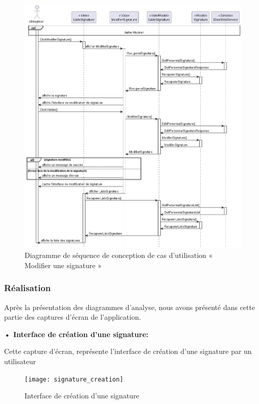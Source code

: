 \begin{figure}[H]
  \centering
  \includegraphics[width=1\textwidth]{out/diagrams/signatures/sequence_update/sequence_update_signature}
  \caption{Diagramme de séquence de conception de cas d'utilisation « Modifier une signature  »}
  \label{fig:sequence_conception_update_signature}
\end{figure}





\subsubsection{Réalisation}

Après la présentation des diagrammes d'analyse, nous avons présenté dans cette partie des captures d'écran de l'application.

\textbf{•	Interface de création d'une signature:}

Cette capture d'écran, représente l'interface de création d'une signature par un utilisateur

\begin{figure}[H]
  \centering
  \texttt{[image: signature\_creation]}
  \caption{Interface de création d'une signature}
  \label{fig:signature_creation}
\end{figure}

